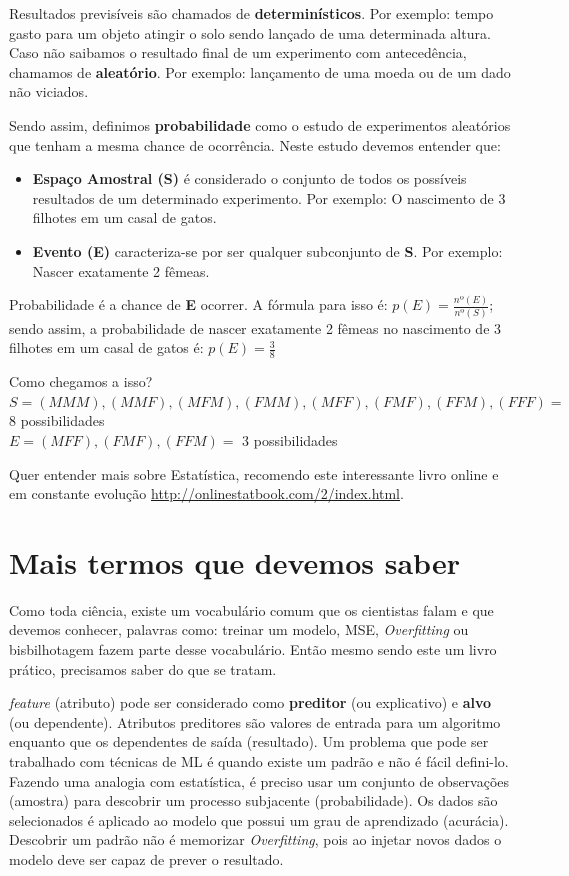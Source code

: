 Resultados previsíveis são chamados de \textbf{determinísticos}. Por exemplo: tempo gasto para um objeto atingir o solo sendo lançado de uma determinada altura. Caso não saibamos o resultado final de um experimento com antecedência, chamamos de \textbf{aleatório}. Por exemplo: lançamento de uma moeda ou de um dado não viciados.

Sendo assim, definimos \textbf{probabilidade} como o estudo de experimentos aleatórios que tenham a mesma chance de ocorrência. Neste estudo devemos entender que:
\begin{itemize}
	\item \textbf{Espaço Amostral (S)} é considerado o conjunto de todos os possíveis resultados de um determinado experimento. Por exemplo: O nascimento de 3 filhotes em um casal de gatos.
	\item \textbf{Evento (E)} caracteriza-se por ser qualquer subconjunto de \textbf{S}. Por exemplo: Nascer exatamente 2 fêmeas.
\end{itemize}

Probabilidade é a chance de \textbf{E} ocorrer. A fórmula para isso é: $p(E) = \frac{nº(E)}{nº(S)}$; sendo assim, a probabilidade de nascer exatamente 2 fêmeas no nascimento de 3 filhotes em um casal de gatos é: $p(E) = \frac{3}{8}$

Como chegamos a isso? \\
$S = {(MMM), (MMF), (MFM), (FMM), (MFF), (FMF), (FFM), (FFF)} = $ 8 possibilidades \\
$E = {(MFF), (FMF), (FFM)} = $ 3 possibilidades


\begin{note} Quer entender mais sobre Estatística, recomendo este interessante livro online e em constante evolução \url{http://onlinestatbook.com/2/index.html}.
\end{note}
	
\section{Mais termos que devemos saber}
Como toda ciência, existe um vocabulário comum que os cientistas falam e que devemos conhecer, palavras como: treinar um modelo, MSE, \textit{Overfitting} ou bisbilhotagem fazem parte desse vocabulário. Então mesmo sendo este um livro prático, precisamos saber do que se tratam.

\textit{feature} (atributo) pode ser considerado como \textbf{preditor} (ou explicativo) e \textbf{alvo} (ou dependente). Atributos preditores são valores de entrada para um algoritmo enquanto que os dependentes de saída (resultado). Um problema que pode ser trabalhado com técnicas de ML é quando existe um padrão e não é fácil defini-lo. Fazendo uma analogia com estatística, é preciso usar um conjunto de observações (amostra) para descobrir um processo subjacente (probabilidade). Os dados são selecionados é aplicado ao modelo que possui um grau de aprendizado (acurácia). Descobrir um padrão não é memorizar \textit{Overfitting}, pois ao injetar novos dados o modelo deve ser capaz de prever o resultado. 

